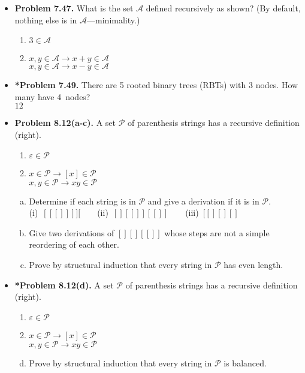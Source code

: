 \documentclass[11pt]{article}
\def\imp{\rightarrow}
\begin{document}
\begin{itemize}
\vspace{0.1in}

\item \textbf{Problem 7.47.}
What is the set $\mathcal{A}$ defined recursively as shown?
(By default, nothing else is in $\mathcal{A}$---minimality.)
\begin{enumerate}[(1)]
\item $3\in\mathcal{A}$
\item $x,y\in\mathcal{A}\imp x+y\in\mathcal{A}$ \\
  $x,y\in\mathcal{A}\imp x-y\in\mathcal{A}$
\end{enumerate}

\vspace{0.1in}

\item \textbf{*Problem 7.49.}
There are 5 rooted binary trees (RBTs) with 3 nodes.
How many have 4~nodes?
\\$12$

\vspace{0.1in}

\item \textbf{Problem 8.12(a-c).}
A set $\mathcal{P}$ of parenthesis strings has a recursive definition (right).
\begin{enumerate}[(1)]
\item $\varepsilon\in\mathcal{P}$
\item $x\in\mathcal{P}\imp [x]\in\mathcal{P}$ \\
  $x,y\in\mathcal{P}\imp xy\in\mathcal{P}$
\end{enumerate}
\begin{enumerate}[(a)]
\item Determine if each string is in $\mathcal{P}$ and
  give a derivation if it is in $\mathcal{P}$. \\
  (i)~$[[[]]]][$\ \ \ \ (ii)~$[][[]][[]]$\ \ \ \ (iii)~$[[][][]$
\item Give two derivations of $[][][[]]$ whose steps are not a simple reordering of each other.
\item Prove by structural induction that every string in $\mathcal{P}$ has even length.
\end{enumerate}

\vspace{0.1in}

\item \textbf{*Problem 8.12(d).}
A set $\mathcal{P}$ of parenthesis strings has a recursive definition (right).
\begin{enumerate}[(1)]
\item $\varepsilon\in\mathcal{P}$
\item $x\in\mathcal{P}\imp [x]\in\mathcal{P}$ \\
  $x,y\in\mathcal{P}\imp xy\in\mathcal{P}$
\end{enumerate}
\begin{enumerate}[(a)]
\setcounter{enumi}{3}
\item Prove by structural induction that every string in $\mathcal{P}$ is balanced.
\end{enumerate}


\end{itemize}
\end{document}
